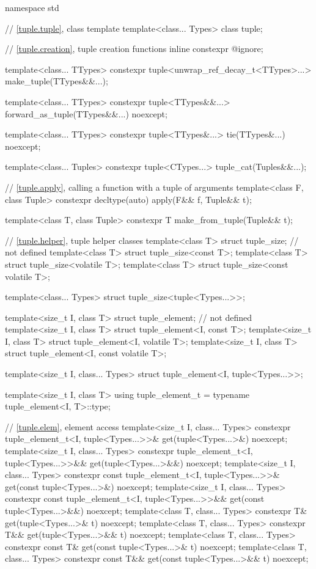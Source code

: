 %
\begin{codeblock}
namespace std {
  // \ref{tuple.tuple}, class template 
  template<class... Types>
    class tuple;

  // \ref{tuple.creation}, tuple creation functions
  inline constexpr @\unspec@ ignore;

  template<class... TTypes>
    constexpr tuple<unwrap_ref_decay_t<TTypes>...> make_tuple(TTypes&&...);

  template<class... TTypes>
    constexpr tuple<TTypes&&...> forward_as_tuple(TTypes&&...) noexcept;

  template<class... TTypes>
    constexpr tuple<TTypes&...> tie(TTypes&...) noexcept;

  template<class... Tuples>
    constexpr tuple<CTypes...> tuple_cat(Tuples&&...);

  // \ref{tuple.apply}, calling a function with a tuple of arguments
  template<class F, class Tuple>
    constexpr decltype(auto) apply(F&& f, Tuple&& t);

  template<class T, class Tuple>
    constexpr T make_from_tuple(Tuple&& t);

  // \ref{tuple.helper}, tuple helper classes
  template<class T> struct tuple_size;                  // not defined
  template<class T> struct tuple_size<const T>;
  template<class T> struct tuple_size<volatile T>;
  template<class T> struct tuple_size<const volatile T>;

  template<class... Types> struct tuple_size<tuple<Types...>>;

  template<size_t I, class T> struct tuple_element;     // not defined
  template<size_t I, class T> struct tuple_element<I, const T>;
  template<size_t I, class T> struct tuple_element<I, volatile T>;
  template<size_t I, class T> struct tuple_element<I, const volatile T>;

  template<size_t I, class... Types>
    struct tuple_element<I, tuple<Types...>>;

  template<size_t I, class T>
    using tuple_element_t = typename tuple_element<I, T>::type;

  // \ref{tuple.elem}, element access
  template<size_t I, class... Types>
    constexpr tuple_element_t<I, tuple<Types...>>& get(tuple<Types...>&) noexcept;
  template<size_t I, class... Types>
    constexpr tuple_element_t<I, tuple<Types...>>&& get(tuple<Types...>&&) noexcept;
  template<size_t I, class... Types>
    constexpr const tuple_element_t<I, tuple<Types...>>& get(const tuple<Types...>&) noexcept;
  template<size_t I, class... Types>
    constexpr const tuple_element_t<I, tuple<Types...>>&& get(const tuple<Types...>&&) noexcept;
  template<class T, class... Types>
    constexpr T& get(tuple<Types...>& t) noexcept;
  template<class T, class... Types>
    constexpr T&& get(tuple<Types...>&& t) noexcept;
  template<class T, class... Types>
    constexpr const T& get(const tuple<Types...>& t) noexcept;
  template<class T, class... Types>
    constexpr const T&& get(const tuple<Types...>&& t) noexcept;

}
\end{codeblock}
